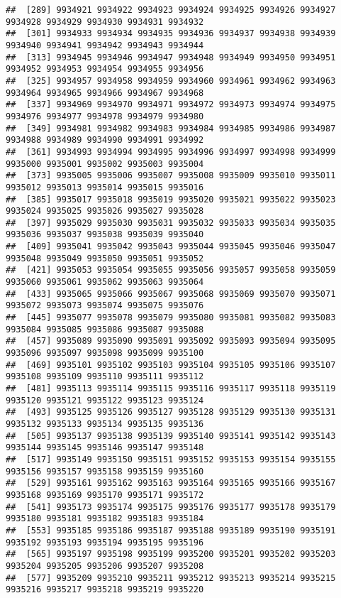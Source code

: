 \documentclass[
]{article}
\begin{document}
\begin{verbatim}
##  [289] 9934921 9934922 9934923 9934924 9934925 9934926 9934927 9934928 9934929 9934930 9934931 9934932
##  [301] 9934933 9934934 9934935 9934936 9934937 9934938 9934939 9934940 9934941 9934942 9934943 9934944
##  [313] 9934945 9934946 9934947 9934948 9934949 9934950 9934951 9934952 9934953 9934954 9934955 9934956
##  [325] 9934957 9934958 9934959 9934960 9934961 9934962 9934963 9934964 9934965 9934966 9934967 9934968
##  [337] 9934969 9934970 9934971 9934972 9934973 9934974 9934975 9934976 9934977 9934978 9934979 9934980
##  [349] 9934981 9934982 9934983 9934984 9934985 9934986 9934987 9934988 9934989 9934990 9934991 9934992
##  [361] 9934993 9934994 9934995 9934996 9934997 9934998 9934999 9935000 9935001 9935002 9935003 9935004
##  [373] 9935005 9935006 9935007 9935008 9935009 9935010 9935011 9935012 9935013 9935014 9935015 9935016
##  [385] 9935017 9935018 9935019 9935020 9935021 9935022 9935023 9935024 9935025 9935026 9935027 9935028
##  [397] 9935029 9935030 9935031 9935032 9935033 9935034 9935035 9935036 9935037 9935038 9935039 9935040
##  [409] 9935041 9935042 9935043 9935044 9935045 9935046 9935047 9935048 9935049 9935050 9935051 9935052
##  [421] 9935053 9935054 9935055 9935056 9935057 9935058 9935059 9935060 9935061 9935062 9935063 9935064
##  [433] 9935065 9935066 9935067 9935068 9935069 9935070 9935071 9935072 9935073 9935074 9935075 9935076
##  [445] 9935077 9935078 9935079 9935080 9935081 9935082 9935083 9935084 9935085 9935086 9935087 9935088
##  [457] 9935089 9935090 9935091 9935092 9935093 9935094 9935095 9935096 9935097 9935098 9935099 9935100
##  [469] 9935101 9935102 9935103 9935104 9935105 9935106 9935107 9935108 9935109 9935110 9935111 9935112
##  [481] 9935113 9935114 9935115 9935116 9935117 9935118 9935119 9935120 9935121 9935122 9935123 9935124
##  [493] 9935125 9935126 9935127 9935128 9935129 9935130 9935131 9935132 9935133 9935134 9935135 9935136
##  [505] 9935137 9935138 9935139 9935140 9935141 9935142 9935143 9935144 9935145 9935146 9935147 9935148
##  [517] 9935149 9935150 9935151 9935152 9935153 9935154 9935155 9935156 9935157 9935158 9935159 9935160
##  [529] 9935161 9935162 9935163 9935164 9935165 9935166 9935167 9935168 9935169 9935170 9935171 9935172
##  [541] 9935173 9935174 9935175 9935176 9935177 9935178 9935179 9935180 9935181 9935182 9935183 9935184
##  [553] 9935185 9935186 9935187 9935188 9935189 9935190 9935191 9935192 9935193 9935194 9935195 9935196
##  [565] 9935197 9935198 9935199 9935200 9935201 9935202 9935203 9935204 9935205 9935206 9935207 9935208
##  [577] 9935209 9935210 9935211 9935212 9935213 9935214 9935215 9935216 9935217 9935218 9935219 9935220

\end{verbatim}
\end{document}
